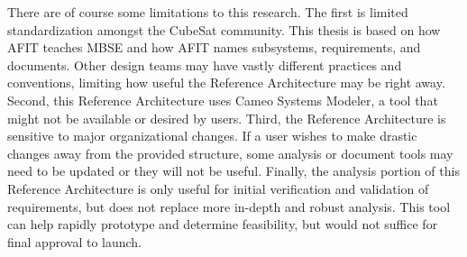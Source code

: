 
    
There are of course some limitations to this research. The first is limited standardization amongst the CubeSat community. This thesis is based on how AFIT teaches MBSE and how AFIT names subsystems, requirements, and documents. Other design teams may have vastly different practices and conventions, limiting how useful the Reference Architecture may be right away. Second, this Reference Architecture uses Cameo Systems Modeler, a tool that might not be available or desired by users. Third, the Reference Architecture is sensitive to major organizational changes. If a user wishes to make drastic changes away from the provided structure, some analysis or document tools may need to be updated or they will not be useful. Finally, the analysis portion of this Reference Architecture is only useful for initial verification and validation of requirements, but does not replace more in-depth and robust analysis. This tool can help rapidly prototype and determine feasibility, but would not suffice for final approval to launch. 